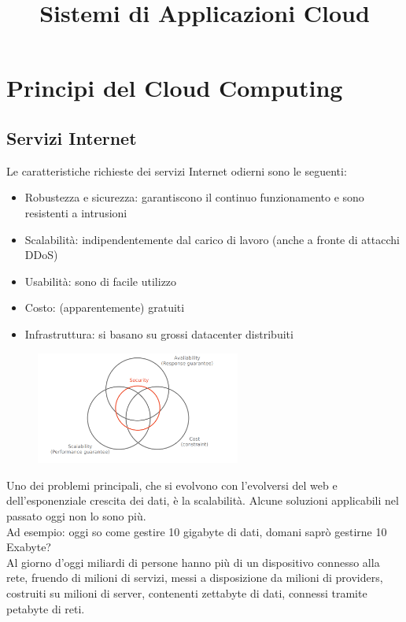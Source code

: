 \documentclass{article}
\title{Sistemi di Applicazioni Cloud}
\begin{document}
		\maketitle
		
		\section{Principi del Cloud Computing}
		
		\subsection{Servizi Internet}
		Le caratteristiche richieste dei servizi Internet odierni sono le seguenti:
		
		\begin{itemize}
		    \item Robustezza e sicurezza: garantiscono il continuo funzionamento e sono resistenti a intrusioni
		    \item Scalabilità: indipendentemente dal carico di lavoro (anche a fronte di attacchi DDoS)
		    \item Usabilità: sono di facile utilizzo
		    \item Costo: (apparentemente) gratuiti
		    \item Infrastruttura: si basano su grossi datacenter distribuiti
		\end{itemize}
		
		\begin{figure}[ht]
			\centering
			\includegraphics[width=0.6\textwidth]{SAC_01.png}
		\end{figure}
		
		Uno dei problemi principali, che si evolvono con l'evolversi del web e dell'esponenziale crescita dei dati, è la scalabilità.
		Alcune soluzioni applicabili nel passato oggi non lo sono più.\\
		Ad esempio: oggi so come gestire 10 gigabyte di dati, domani saprò gestirne 10 Exabyte?\\
		
		Al giorno d'oggi miliardi di persone hanno più di un dispositivo connesso alla rete, fruendo di milioni di servizi, messi a disposizione da milioni di providers, costruiti su milioni di server, contenenti zettabyte di dati, connessi tramite petabyte di reti.\\
		
\end{document}
